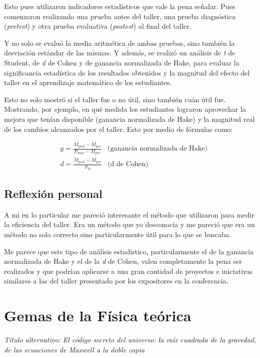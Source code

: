 \documentclass[11pt]{article}
\begin{document}
    Esto pues utilizaron indicadores estadísticos que vale la pena señalar. Pues comenzaron realizando una prueba antes del taller, una prueba diagnóstica (\textit{pretest}) y otra prueba evaluativa (\textit{postest}) al final del taller.

    Y no solo se evaluó la media aritmética de ambas pruebas, sino también la desviación estándar de las mismas. Y además, se realizó un análisis de \textit{t} de Student, de \textit{d} de Cohen y de ganancia normalizada de Hake, para evaluar la significancia estadística de los resultados obtenidos y la magnitud del efecto del taller en el aprendizaje matemático de los estudiantes.

    Esto no solo mostró si el taller fue o no útil, sino también cuán útil fue. Mostrando, por ejemplo, en qué medida los estudiantes lograron aprovechar la mejora que tenían disponible (ganancia normalizada de Hake) y la magnitud real de los cambios alcanzados por el taller. Esto por medio de fórmulas como:

    \begin{align*}
        &g = \frac{M_{post} - M_{pre}}{P_{max} - M_{pre}} & \text{(ganancia normalizada de Hake)}\\[5pt]
        &d = \frac{M_{post} - M_{pre}}{S_{D}} & \text{(d de Cohen)}
    \end{align*}

    \subsection{Reflexión personal}
    A mi en lo particular me pareció interesante el método que utilizaron para medir la eficiencia del taller. Era un método que yo desconocía y me pareció que era un método no solo correcto sino particularmente útil para lo que se buscaba.

    Me parece que este tipo de análisis estadístico, particularmente el de la ganancia normalizada de Hake y el de la \textit{d} de Cohen, valen completamente la pena ser realizados y que podrían aplicarse a una gran cantidad de proyectos e iniciativas similares a las del taller presentado por los expositores en la conferencia.

    \section{Gemas de la Física teórica}
    \textit{Título alternativo: El código secreto del universo: la raíz cuadrada de la gravedad, de las ecuaciones de Maxwell a la doble copia}
\end{document}
